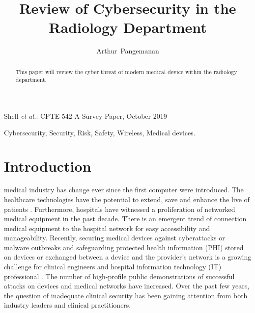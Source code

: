 \documentclass{IEEEtran}
\begin{document}
%
\title{Review of Cybersecurity in the Radiology Department}


\author{Arthur~Pangemanan}%



%
{Shell \MakeLowercase{\textit{et al.}}: CPTE-542-A Survey Paper, October 2019}

\maketitle

\begin{abstract}
	
	
	This paper will review the cyber threat of modern medical device within the radiology department.
\end{abstract}

\begin{IEEEkeywords}
Cybersecurity, Security, Risk, Safety, Wireless, Medical devices.
\end{IEEEkeywords}


\section{Introduction}
 medical industry has change ever since the first computer were introduced. The healthcare technologies have the potential to extend, save and enhance the live of patients \cite{coventry2018cybersecurity}. Furthermore, hospitals have witnessed a proliferation of networked medical equipment in the past decade. There is an emergent trend of connection medical equipment to the hospital network for easy accessibility and manageability. Recently, securing medical devices against cyberattacks or malware outbreaks and safeguarding protected health information (PHI) stored on devices or exchanged between a device and the provider's network is a growing challenge for clinical engineers and hospital information technology (IT) professional \cite{wirth2011cybercrimes}. The number of high-profile public demonstrations of successful attacks on devices and medical networks have increased. 
	Over the past few years, the question of inadequate clinical security has been gaining attention from both industry leaders and clinical practitioners.
\end{document}
